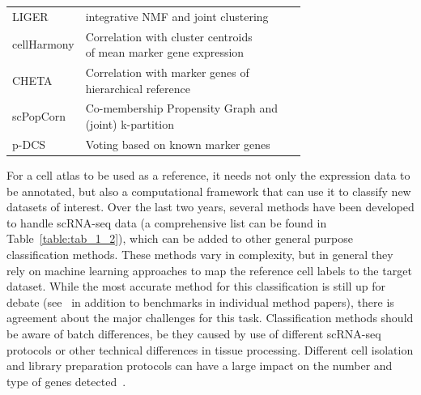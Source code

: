 \begin{table}[p]
\begin{tabular}{l|l|c}
LIGER & integrative NMF and joint clustering & ~\citep{welch_single-cell_2019}\\

cellHarmony & \specialcell[t]{Correlation with cluster centroids\\of mean marker gene expression} & ~\citep{depasquale_cellharmony:_2019}\\

CHETA & \specialcell[t]{Correlation with marker genes of\\hierarchical reference} & ~\citep{de_kanter_chetah:_2019}\\

scPopCorn & \specialcell[t]{Co-membership Propensity Graph and\\(joint) k-partition} & ~\citep{wang_subpopulation_2019}\\

p-DCS & Voting based on known marker genes & ~\citep{domanskyi_polled_2019}\\

\bottomrule
\end{tabular}
\end{table}

For a cell atlas to be used as a reference, it needs not only the expression data to be annotated, but also a computational framework that can use it to classify new datasets of interest. Over the last two years, several methods have been developed to handle scRNA-seq data (a comprehensive list can be found in Table~\ref{table:tab_1_2}), which can be added to other general purpose classification methods. These methods vary in complexity, but in general they rely on machine learning approaches to map the reference cell labels to the target dataset. While the most accurate method for this classification is still up for debate (see~\citep{abdelaal_comparison_2019,kohler_deep_2019} in addition to benchmarks in individual method papers), there is agreement about the major challenges for this task. Classification methods should be aware of batch differences, be they caused by use of different scRNA-seq protocols or other technical differences in tissue processing. Different cell isolation and library preparation protocols can have a large impact on the number and type of genes detected~\citep{mereu_benchmarking_2019}.

